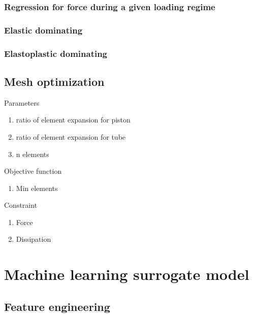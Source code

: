 \documentclass{article}
\begin{document}
\subsubsection*{Regression for force during a given loading regime}
\subsubsection*{Elastic dominating}
\subsubsection*{Elastoplastic dominating}

\subsection{Mesh optimization}

Parameters
\begin{enumerate}
	\item ratio of element expansion for piston
	\item ratio of element expansion for tube
	\item n elements
\end{enumerate}

Objective function
\begin{enumerate}
	\item Min elements
\end{enumerate}

Constraint
\begin{enumerate}
	\item Force
	\item Dissipation
\end{enumerate}

\section{Machine learning surrogate model}
\subsection{Feature engineering}
\end{document}
